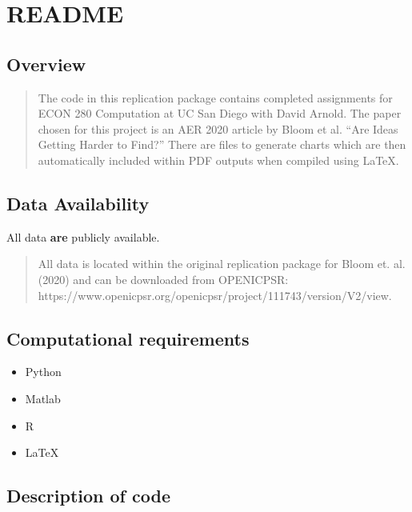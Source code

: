 \documentclass[
]{article}
\author{}
\date{}
\begin{document}
\hypertarget{readme}{%
\section{README}\label{readme}}

\hypertarget{overview}{%
\subsection{Overview}\label{overview}}

\begin{quote}
The code in this replication package contains completed assignments for ECON 280 Computation at UC San Diego with David Arnold. The paper chosen for this project is an AER 2020 article by Bloom et al. ``Are Ideas Getting Harder to Find?'' There are files to generate charts which are then automatically included within PDF outputs when compiled using LaTeX. 
\end{quote}

\hypertarget{data-availability}{%
\subsection{Data Availability}\label{data-availability}}
  All data \textbf{are} publicly available.

\begin{quote}
All data is located within the original replication package for Bloom et. al. (2020) and can be downloaded from OPENICPSR: 
https://www.openicpsr.org/openicpsr/project/111743/version/V2/view. 
\end{quote}

\hypertarget{computational-requirements}{%
\subsection{Computational
requirements}\label{computational-requirements}}

\begin{itemize}
\item
  Python
\item
  Matlab 
\item
  R
\item
  LaTeX
\end{itemize}

\hypertarget{description-of-code}{%
\subsection{Description of
code}\label{description-of-code}}
\end{document}

